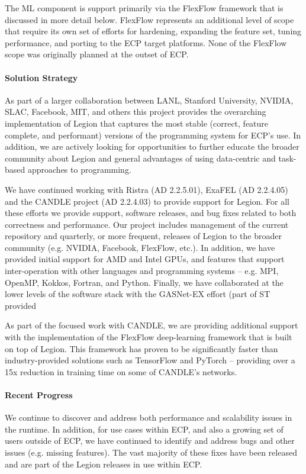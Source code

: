 The ML component is support primarily via the FlexFlow framework that
is discussed in more detail below. FlexFlow represents an additional
level of scope that require its own set of efforts for hardening,
expanding the feature set, tuning performance, and porting to the ECP
target platforms.  None of the FlexFlow scope was originally planned at the
outset of ECP. 

\paragraph{Solution Strategy}
As part of a larger collaboration between LANL, Stanford University,
NVIDIA, SLAC, Facebook, MIT, and others this project provides the
overarching implementation of Legion that captures the most stable
(correct, feature complete, and performant) versions of the programming
system for ECP's use.  In addition, we are actively looking for
opportunities to further educate the broader community about Legion 
and general advantages of using data-centric and task-based approaches
to programming.

We have continued working with Ristra (AD 2.2.5.01), ExaFEL (AD
2.2.4.05) and the CANDLE project (AD 2.2.4.03) to provide support for
Legion.  For all these efforts we provide support, software releases,
and bug fixes related to both correctness and performance. Our project
includes management of the current repository and quarterly, or more
frequent, releases of Legion to the broader community (e.g. NVIDIA,
Facebook, FlexFlow, etc.).  In addition, we have provided initial
support for AMD and Intel GPUs, and features that support
inter-operation with other languages and programming systems --
e.g. MPI, OpenMP, Kokkos, Fortran, and Python. Finally, we have collaborated
at the lower levels of the software stack with the GASNet-EX effort (part
of ST provided

As part of the focused work with CANDLE, we are providing additional
support with the implementation of the FlexFlow deep-learning
framework that is built on top of Legion.  This framework has proven to
be significantly faster than industry-provided solutions such as TensorFlow
and PyTorch -- providing over a 15x reduction in training time on some of
CANDLE's networks. 

\paragraph{Recent Progress}

We continue to discover and address both performance and scalability
issues in the runtime.  In addition, for use cases within ECP, and
also a growing set of users outside of ECP, we have continued to
identify and address bugs and other issues (e.g. missing features).
The vast majority of these fixes have been released and are part of
the Legion releases in use within ECP.

